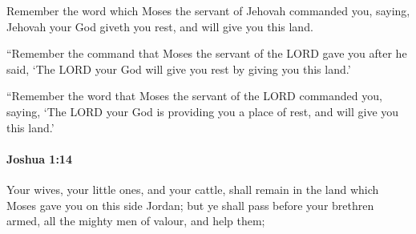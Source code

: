 			\begin{versebox}
					\item[BHS] 
					\item[ASV] Remember the word which Moses the servant of Jehovah commanded you, saying, Jehovah your God giveth you rest, and will give you this land.
					\item[NIV] “Remember the command that Moses the servant of the LORD gave you after he said, ‘The LORD your God will give you rest by giving you this land.’
					\item[NRSV] “Remember the word that Moses the servant of the LORD commanded you, saying, ‘The LORD your God is providing you a place of rest, and will give you this land.’
			\end{versebox}

		\paragraph{Joshua 1:14} %
			\label{JOSHUA-1-14}

			Your wives, your little ones, and your cattle, shall remain in the land which Moses gave you on this side Jordan; but ye shall pass before your brethren armed, all the mighty men of valour, and help them;

